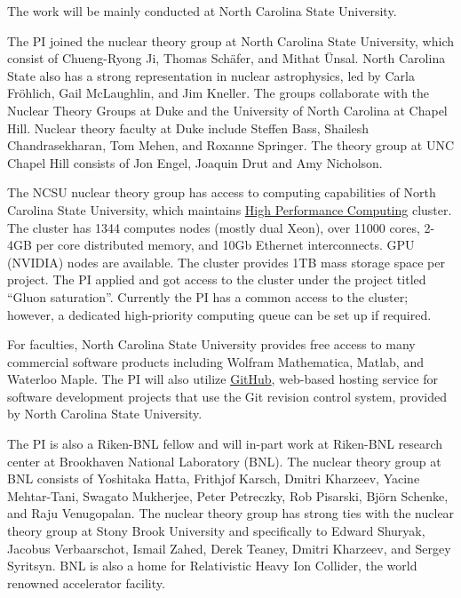\documentclass{DOEproposal}
\begin{document}
		The work will be mainly conducted at North Carolina State University. 


		The PI joined 
		the nuclear theory group at North Carolina State University, which consist
		of Chueng-Ryong Ji, Thomas Sch\"afer, and Mithat \"Unsal. 
		North Carolina State also has a strong representation in	
		nuclear astrophysics, led by Carla Fr\"ohlich, Gail McLaughlin,
		and Jim Kneller. 
		The groups collaborate with the Nuclear Theory Groups 
		at Duke  and the University of North
		Carolina at Chapel Hill. 
		Nuclear theory faculty at Duke include Steffen Bass, 
		Shailesh Chandrasekharan, Tom Mehen, and Roxanne Springer. 
		The theory group at UNC Chapel Hill consists of Jon Engel, Joaquin Drut and Amy Nicholson.
		
		The  NCSU nuclear theory group has access to computing capabilities of  
		North Carolina State University, which   
		maintains \href{https://projects.ncsu.edu/hpc//main.php}{High Performance Computing} 
		cluster. The cluster has 1344 computes nodes (mostly dual Xeon), 
		over 11000 cores, 2-4GB per core distributed memory, and 10Gb Ethernet interconnects.
		GPU (NVIDIA) nodes are available. 
		The cluster provides 1TB mass storage space per project. 
		The PI applied and got access to the cluster under the project titled  
		``Gluon saturation''. 
		Currently the PI has a common access 
		to the cluster; however, a dedicated high-priority computing queue can be set up 
		if required. 
		
		For faculties, North Carolina State University provides free access to 
		many commercial software products including Wolfram Mathematica, Matlab, and
		Waterloo Maple.  The PI will also utilize \href{https://github.ncsu.edu}{GitHub}, 
		web-based hosting service 
		for software development projects that use the Git revision control system, 
		provided by North Carolina State University.  


		The PI is also a Riken-BNL fellow and will in-part work  at 
		Riken-BNL research center at Brookhaven National Laboratory (BNL). 
		The nuclear theory group at BNL consists of 
		Yoshitaka Hatta,
		Frithjof Karsch,
		Dmitri Kharzeev,
		Yacine Mehtar-Tani,
		Swagato Mukherjee,
		Peter Petreczky,
		Rob Pisarski,
		Bj\"orn Schenke,
		and Raju Venugopalan. 
		The nuclear theory group has strong ties with the nuclear theory group 
		at Stony Brook University and specifically to 
		Edward Shuryak, Jacobus Verbaarschot, Ismail Zahed,  Derek Teaney,
		Dmitri Kharzeev, and  Sergey Syritsyn. 
		BNL is also a home for Relativistic Heavy Ion Collider, the world renowned 
		accelerator facility.    
\end{document}
